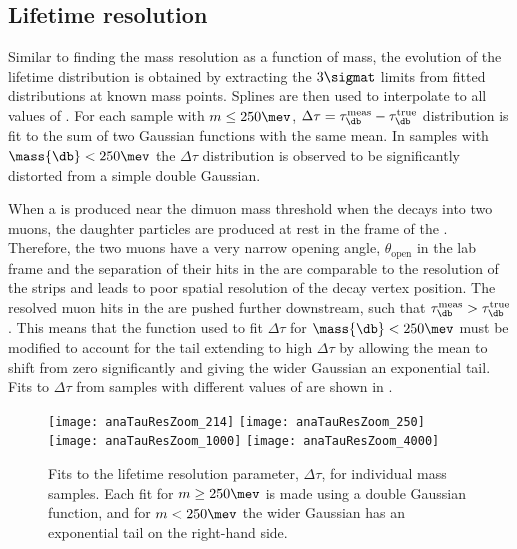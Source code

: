 

\subsection{Lifetime resolution}
Similar to finding the mass resolution as a function of mass, the evolution of the lifetime
distribution is obtained by extracting the $3\sigmat$ limits from fitted distributions at known \db
mass points.
Splines are then used to interpolate to all values of \mass{\db}.
For each \btokstrdb sample with $m\leq250\mev$,
$\Delta\tau=\tau^\mathrm{meas}_{\db}-\tau^\mathrm{true}_{\db}$ distribution is fit to the sum of
two Gaussian functions with the same mean.
In samples with $\mass{\db}<250\mev$ the $\Delta\tau$ distribution is observed to be significantly
distorted from a simple double Gaussian.

When a \db is produced near the dimuon mass threshold when the \db decays into two muons, the
daughter particles are produced at rest in the frame of the \db.
Therefore, the two muons have a very narrow opening angle, $\theta_\mathrm{open}$ in the lab frame
and the separation of their hits in the \velo are
comparable to the resolution of the \velo strips and leads to poor spatial resolution of
the \db decay vertex position.
The resolved muon hits in the \velo are pushed further downstream, such that
$\tau^\mathrm{meas}_{\db}>\tau^\mathrm{true}_{\db}$.
This means that the function used to fit $\Delta\tau$ for $\mass{\db}<250\mev$ must be modified to
account for the tail extending to high $\Delta\tau$ by allowing the mean to shift from zero
significantly and giving the wider Gaussian an exponential tail.
Fits to $\Delta\tau$ from \btokstrdb samples with different values of \mass{\db} are shown in
.

\begin{figure}
  \begin{center}
    \texttt{[image: anaTauResZoom\_214]}
    \texttt{[image: anaTauResZoom\_250]}
    \texttt{[image: anaTauResZoom\_1000]}
    \texttt{[image: anaTauResZoom\_4000]}
  \end{center}
  \caption{
    Fits to the lifetime resolution parameter, $\Delta\tau$, for individual mass samples.
    Each fit for $m\geq250\mev$ is made using a double Gaussian function, and for $m<250\mev$ the
    wider Gaussian has an exponential tail on the right-hand side.
  }
  \label{fig:taures:zoom}
\end{figure}

